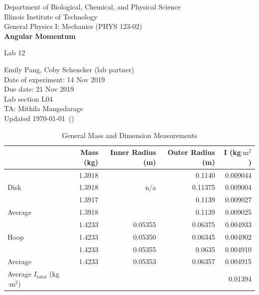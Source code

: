 \documentclass [12pt, letterpaper, twoside] {article}
\begin{document}
\begin {titlepage}
\begin {center}
Department of Biological, Chemical, and Physical Science\\
\vspace {0.1cm}
Illinois Institute of Technology\\
\vspace {0.1cm}
General Physics I: Mechanics (PHYS 123-02)\\
\vspace* {\fill}
\begingroup
\Large
\textbf {Angular Momentum}
\vspace {0.35cm}

\normalsize
Lab 12
\vspace {1.5cm}
\endgroup
\vspace* {\fill}
\end {center}

\vspace*{\fill}
\begin {flushright}
\footnotesize
Emily Pang, Coby Schencker (lab partner)\\
Date of experiment: 14 Nov 2019\\
Due date: 21 Nov 2019\\
Lab section L04\\
TA: Mithila Mangedarage\\
Updated \usdate\today~(\currenttime)
\end {flushright}
\end {titlepage}

\begin {table}[h!]
  \centering
  \begin {tabular} {| l | r | r | r | r |}
    \hline\hline
    & Mass (kg) & Inner Radius (m) & Outer Radius (m) & I (kg\(\cdot\text{m}^2\))\\
    \hline
    \multirow{3}{*}{Disk} & 1.3918 & & 0.1140 & 0.009044 \\ %
    & 1.3918 & n/a & 0.11375 & 0.009004 \\ %
    & 1.3917 & & 0.1139 & 0.009027 \\ %
    \hline
    Average & 1.3918 & & 0.1139 & 0.009025 \\ %
    \hline
    \multirow{3}{*}{Hoop} & 1.4233 & 0.05355 & 0.06375 & 0.004933 \\ %
    & 1.4233 & 0.05350 & 0.06345 & 0.004902 \\ %
    & 1.4233 & 0.05355 & 0.0635 & 0.004910 \\ %
    \hline
    Average & 1.4233 & 0.05353 & 0.06357 & 0.004915 \\ %
    \hline
    Average \(I_{total}\) (kg\(\cdot{\text{m}}^2\)) & & & & 0.01394 \\ %
    \hline\hline
  \end {tabular}
  \caption {General Mass and Dimension Measurements}
\end {table}
\end{document}
